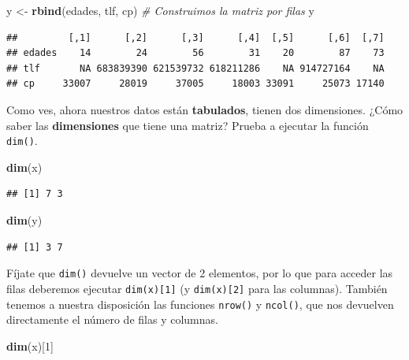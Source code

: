 \documentclass[11pt,]{book}
\newenvironment{Shaded}{\begin{snugshade}}{\end{snugshade}}
\newcommand{\CommentTok}[1]{\textcolor[rgb]{0.37,0.37,0.37}{\textit{#1}}}
\newcommand{\DecValTok}[1]{\textcolor[rgb]{0.06,0.06,0.06}{#1}}
\newcommand{\KeywordTok}[1]{\textcolor[rgb]{0.27,0.27,0.27}{\textbf{#1}}}
\newcommand{\NormalTok}[1]{#1}
\newcommand{\StringTok}[1]{\textcolor[rgb]{0.5,0.5,0.5}{#1}}
\begin{document}
\begin{Shaded}
\begin{Highlighting}[]
\NormalTok{y <-}\StringTok{ }\KeywordTok{rbind}\NormalTok{(edades, tlf, cp) }\CommentTok{# Construimos la matriz por filas}
\NormalTok{y}
\end{Highlighting}
\end{Shaded}

\begin{verbatim}
##         [,1]      [,2]      [,3]      [,4]  [,5]      [,6]  [,7]
## edades    14        24        56        31    20        87    73
## tlf       NA 683839390 621539732 618211286    NA 914727164    NA
## cp     33007     28019     37005     18003 33091     25073 17140
\end{verbatim}

Como ves, ahora nuestros datos están \textbf{tabulados}, tienen dos dimensiones. ¿Cómo saber las \textbf{dimensiones} que tiene una matriz? Prueba a ejecutar la función \texttt{dim()}.

\begin{Shaded}
\begin{Highlighting}[]
\KeywordTok{dim}\NormalTok{(x)}
\end{Highlighting}
\end{Shaded}

\begin{verbatim}
## [1] 7 3
\end{verbatim}

\begin{Shaded}
\begin{Highlighting}[]
\KeywordTok{dim}\NormalTok{(y)}
\end{Highlighting}
\end{Shaded}

\begin{verbatim}
## [1] 3 7
\end{verbatim}

Fíjate que \texttt{dim()} devuelve un vector de 2 elementos, por lo que para acceder las filas deberemos ejecutar \texttt{dim(x){[}1{]}} (y \texttt{dim(x){[}2{]}} para las columnas). También tenemos a nuestra disposición las funciones \texttt{nrow()} y \texttt{ncol()}, que nos devuelven directamente el número de filas y columnas.

\begin{Shaded}
\begin{Highlighting}[]
\KeywordTok{dim}\NormalTok{(x)[}\DecValTok{1}\NormalTok{]}
\end{Highlighting}
\end{Shaded}
\end{document}
